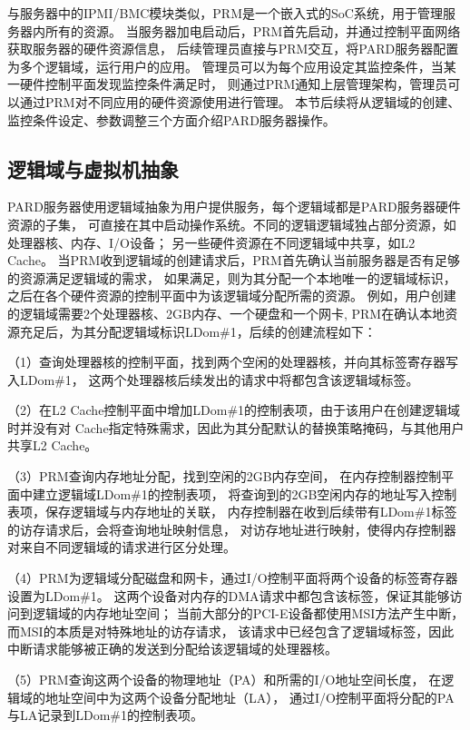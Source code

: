 与服务器中的IPMI/BMC模块类似，PRM是一个嵌入式的SoC系统，用于管理服务器内所有的资源。
当服务器加电启动后，PRM首先启动，并通过控制平面网络获取服务器的硬件资源信息，
后续管理员直接与PRM交互，将PARD服务器配置为多个逻辑域，运行用户的应用。
管理员可以为每个应用设定其监控条件，当某一硬件控制平面发现监控条件满足时，
则通过PRM通知上层管理架构，管理员可以通过PRM对不同应用的硬件资源使用进行管理。
本节后续将从逻辑域的创建、监控条件设定、参数调整三个方面介绍PARD服务器操作。

\subsection{逻辑域与虚拟机抽象}

PARD服务器使用逻辑域抽象为用户提供服务，每个逻辑域都是PARD服务器硬件资源的子集，
可直接在其中启动操作系统。不同的逻辑逻辑域独占部分资源，如处理器核、内存、I/O设备；
另一些硬件资源在不同逻辑域中共享，如L2 Cache。
当PRM收到逻辑域的创建请求后，PRM首先确认当前服务器是否有足够的资源满足逻辑域的需求，
如果满足，则为其分配一个本地唯一的逻辑域标识，
之后在各个硬件资源的控制平面中为该逻辑域分配所需的资源。
例如，用户创建的逻辑域需要2个处理器核、2GB内存、一个硬盘和一个网卡,
PRM在确认本地资源充足后，为其分配逻辑域标识LDom\#1，后续的创建流程如下：

（1）查询处理器核的控制平面，找到两个空闲的处理器核，并向其标签寄存器写入LDom\#1，
这两个处理器核后续发出的请求中将都包含该逻辑域标签。

（2）在L2 Cache控制平面中增加LDom\#1的控制表项，由于该用户在创建逻辑域时并没有对
Cache指定特殊需求，因此为其分配默认的替换策略掩码，与其他用户共享L2 Cache。

（3）PRM查询内存地址分配，找到空闲的2GB内存空间，
在内存控制器控制平面中建立逻辑域LDom\#1的控制表项，
将查询到的2GB空闲内存的地址写入控制表项，保存逻辑域与内存地址的关联，
内存控制器在收到后续带有LDom\#1标签的访存请求后，会将查询地址映射信息，
对访存地址进行映射，使得内存控制器对来自不同逻辑域的请求进行区分处理。

（4）PRM为逻辑域分配磁盘和网卡，通过I/O控制平面将两个设备的标签寄存器设置为LDom\#1。
这两个设备对内存的DMA请求中都包含该标签，保证其能够访问到逻辑域的内存地址空间；
当前大部分的PCI-E设备都使用MSI方法产生中断，而MSI的本质是对特殊地址的访存请求，
该请求中已经包含了逻辑域标签，因此中断请求能够被正确的发送到分配给该逻辑域的处理器核。

（5）PRM查询这两个设备的物理地址（PA）和所需的I/O地址空间长度，
在逻辑域的地址空间中为这两个设备分配地址（LA），
通过I/O控制平面将分配的PA与LA记录到LDom\#1的控制表项。

